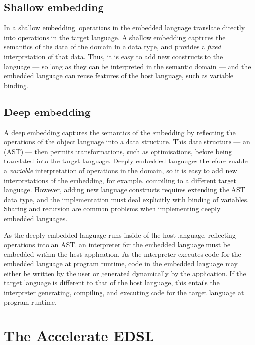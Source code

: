 \subsection{Shallow embedding}

In a shallow embedding, operations in the embedded language translate directly
into operations in the target language. A shallow embedding captures the
semantics of the data of the domain in a data type, and provides a \emph{fixed}
interpretation of that data. Thus, it is easy to add new constructs to the
language --- so long as they can be interpreted in the semantic domain --- and
the embedded language can reuse features of the host language, such as variable
binding.


\subsection{Deep embedding}

A deep embedding captures the semantics of the embedding by reflecting the
operations of the object language into a data structure. This data structure ---
an  (AST) --- then permits transformations, such as
optimisations, before being translated into the target language. Deeply embedded
languages therefore enable a \emph{variable} interpretation of operations in the
domain, so it is easy to add new interpretations of the embedding, for example,
compiling to a different target language. However, adding new language
constructs requires extending the AST data type, and the implementation must
deal explicitly with binding of variables. Sharing and recursion are common
problems when implementing deeply embedded languages.

As the deeply embedded language runs inside of the host language, reflecting
operations into an AST, an interpreter for the embedded language must be
embedded within the host application.
As the interpreter executes code for the embedded language at program runtime,
code in the embedded language may either be written by the user or generated
dynamically by the application. If the target language is different to that of
the host language, this entails the interpreter generating, compiling, and
executing code for the target language at program runtime.


\section{The Accelerate EDSL}

